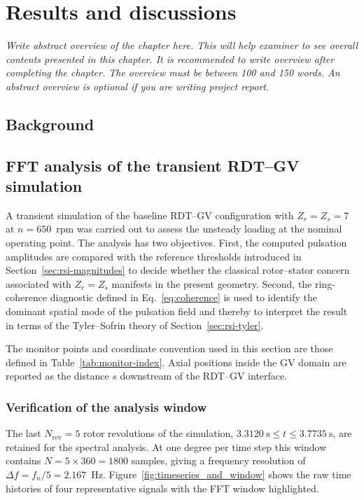 \chapter{Results and discussions}
\label{chap:chap5}  

\begin{center} %
\singlespacing\parbox{12cm}{\textit{
    Write abstract overview of the chapter here. This will help examiner to see overall contents presented in this chapter. It is recommended to write overview after completing the chapter. The overview must be between 100 and 150 words. An abstract overview is optional if you are writing project report.
    }}
\end{center}

\section{Background}
\section{FFT analysis of the transient RDT--GV simulation}
\label{sec:results-fft}
 
A transient simulation of the baseline RDT--GV
configuration with $Z_r = Z_s = 7$ at $n = 650$~rpm was carried out
to assess the unsteady loading at the nominal operating point. The
analysis has two objectives. First, the computed pulsation amplitudes
are compared with the reference thresholds introduced in
Section~\ref{sec:rsi-magnitudes} to decide whether the classical
rotor--stator concern associated with $Z_r = Z_s$ manifests in the
present geometry. Second, the ring-coherence diagnostic defined in
Eq.~\eqref{eq:coherence} is used to identify the dominant spatial
mode of the pulsation field and thereby to interpret the result in
terms of the Tyler--Sofrin theory of Section~\ref{sec:rsi-tyler}.
 
The monitor points and coordinate convention used in this section
are those defined in Table~\ref{tab:monitor-index}. Axial positions
inside the GV domain are reported as the distance $s$
downstream of the RDT--GV interface.
 
\subsection{Verification of the analysis window}
\label{sec:results-window}
 
The last $N_{\mathrm{rev}}=5$ rotor revolutions of the simulation,
$3.3120~\mathrm{s} \leq t \leq 3.7735~\mathrm{s}$, are retained for
the spectral analysis. At one degree per time step this window
contains $N = 5\times 360 = 1800$ samples, giving a frequency
resolution of $\Delta f = f_n/5 = 2.167$~Hz.
Figure~\ref{fig:timeseries_and_window} shows the raw time histories
of four representative signals with the FFT window highlighted.
 
